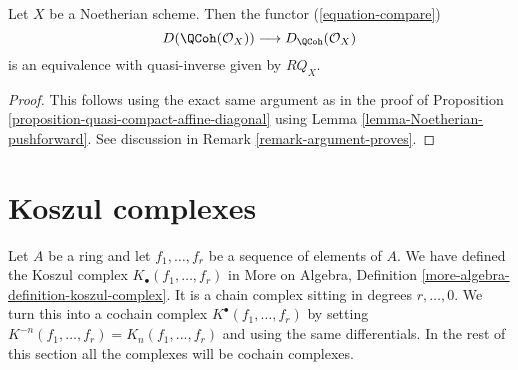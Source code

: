 \begin{proposition}
\label{proposition-Noetherian}
Let $X$ be a Noetherian scheme. Then the functor (\ref{equation-compare})
$$
D(\QCoh(\mathcal{O}_X))
\longrightarrow
D_\QCoh(\mathcal{O}_X)
$$
is an equivalence with quasi-inverse given by $RQ_X$.
\end{proposition}

\begin{proof}
This follows using the exact same argument as in the proof of
Proposition \ref{proposition-quasi-compact-affine-diagonal}
using Lemma \ref{lemma-Noetherian-pushforward}.
See discussion in Remark \ref{remark-argument-proves}.
\end{proof}






\section{Koszul complexes}
\label{section-koszul}

\noindent
Let $A$ be a ring and let $f_1, \ldots, f_r$ be a sequence of elements
of $A$. We have defined the Koszul complex
$K_\bullet(f_1, \ldots, f_r)$ in
More on Algebra, Definition \ref{more-algebra-definition-koszul-complex}.
It is a chain complex sitting in degrees $r, \ldots, 0$.
We turn this into a cochain complex $K^\bullet(f_1, \ldots, f_r)$
by setting $K^{-n}(f_1, \ldots, f_r) = K_n(f_1, \ldots, f_r)$
and using the same differentials. In the rest of this section all
the complexes will be cochain complexes.

